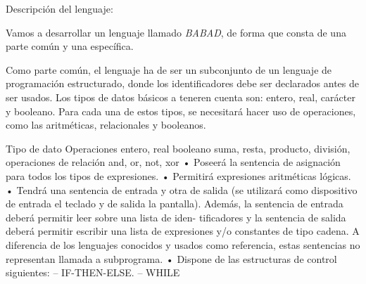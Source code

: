 Descripción del lenguaje:

Vamos a desarrollar un lenguaje llamado \textit{BABAD}, de forma que consta de una parte común y una específica.

Como parte común, el lenguaje ha de ser un subconjunto de un lenguaje de programación estructurado, donde los identificadores debe ser declarados antes de ser usados. Los tipos de datos básicos a teneren cuenta son: entero, real, carácter y booleano. Para cada una de estos tipos, se necesitará hacer uso de operaciones, como las aritméticas, relacionales y booleanos.

Tipo de dato Operaciones
entero, real
booleano suma, resta, producto, división, operaciones de relación
and, or, not, xor
• Poseerá la sentencia de asignación para todos los tipos de expresiones.
• Permitirá expresiones aritméticas lógicas.
• Tendrá una sentencia de entrada y otra de salida (se utilizará como dispositivo de entrada el teclado
y de salida la pantalla). Además, la sentencia de entrada deberá permitir leer sobre una lista de iden-
tificadores y la sentencia de salida deberá permitir escribir una lista de expresiones y/o constantes
de tipo cadena. A diferencia de los lenguajes conocidos y usados como referencia, estas sentencias
no representan llamada a subprograma.
• Dispone de las estructuras de control siguientes:
– IF-THEN-ELSE.
– WHILE
